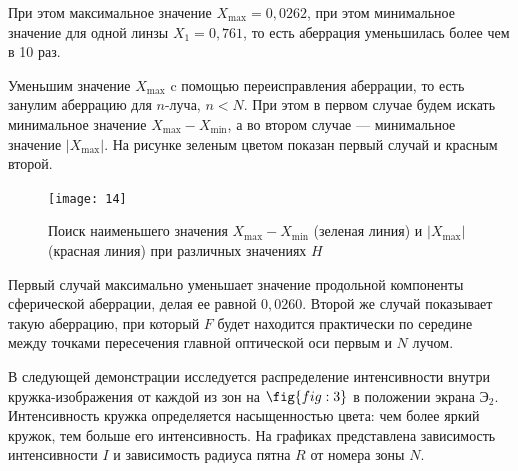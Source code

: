 \documentclass[a4paper, 12pt]{article}
\begin{document}
При этом максимальное значение $X_{\text{max}} = 0,0262$, при этом минимальное значение
для одной линзы $X_1 = 0,761$, то есть аберрация уменьшилась более чем
в 10 раз.

Уменьшим значение $X_{\text{max}}$ c помощью переисправления
аберрации, то есть занулим аберрацию для $n$-луча, $n<N$. При этом в
первом случае будем искать минимальное значение
$X_{\text{max}}-X_{\text{min}}$, а во втором случае --- минимальное
значение $|X_{\text{max}}|$. На рисунке зеленым цветом показан первый
случай и красным второй. 

\begin{figure}[H]
    \texttt{[image: 14]} 
    \caption{Поиск наименьшего значения
        $X_{\text{max}}-X_{\text{min}}$ (зеленая линия) и
        $|X_{\text{max}}|$ (красная линия) при различных
    значениях $H$}
\label{fig:5a}
\end{figure}

Первый случай максимально уменьшает значение продольной компоненты
сферической аберрации, делая ее равной $0,0260$. Второй же случай
показывает такую аберрацию, при который $F$ будет находится
практически по
середине между точками пересечения главной оптической оси первым и $N$
лучом.

В следующей демонстрации исследуется распределение интенсивности
внутри кружка-изображения от каждой из зон на $\fig{fig:3}$ в
положении экрана $\text{Э}_2$.
Интенсивность кружка определяется насыщенностью цвета: чем более яркий
кружок, тем больше его интенсивность. На графиках представлена
зависимость интенсивности $I$ и зависимость радиуса пятна $R$
от номера зоны $N$.
\end{document}
